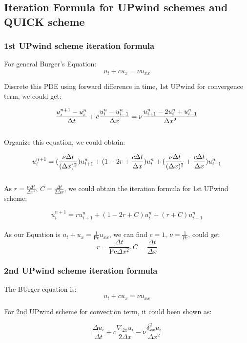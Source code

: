 \documentclass[12pt]{article}
\begin{document}
\subsection{Iteration Formula for UPwind schemes and QUICK 
scheme}

\subsubsection{1st UPwind scheme iteration formula}

For general Burger's Equation:
$$
u_t + cu_x = {\nu} u_{xx}
$$

Discrete this PDE using forward difference in time,
1st UPwind for convergence term, we could get:

$$
\frac{u_i^{n+1} - u_i^n}{\Delta t} + c \frac{u_{i}^n - u_{i-1}^n}{\Delta x} = \nu \frac{u_{i+1}^n - 2u_i^n + u_{i-1}^n}{\Delta x^2} \\
$$\\

Organize this equation, we could obtain:

$$
u_i^{n+1} = (\frac{\nu \Delta t}{(\Delta x)^2})u_{i+1}^n + (1-2r+\frac{c\Delta t}{\Delta x})u_i^n + (\frac{\nu \Delta t}{(\Delta x)^2}  + \frac{c\Delta t}{\Delta x})u_{i-1}^n \\
$$\\

As \( r = \frac{\nu \Delta t}{\Delta x^2} \), \( C = \frac{\Delta t}{2\Delta x} \),
we could obtain the iteration formula for 1st UPwind scheme:

$$
u_i^{n+1} = r u_{i+1}^n + (1-2r +C)u_i^n +  (r + C)u_{i-1}^n
$$\\

As our Equation is \( u_t + u_x = \frac{1}{\text{Pe}} u_{xx} \), 
we can find \( c = 1 \),
$\nu = \frac{1}{Pe}$,
could get 
 $$ r = \frac{\Delta t}{\text{Pe}\Delta x^2} ,  C = \frac{\Delta t}{\Delta x} $$



\subsubsection{2nd UPwind scheme iteration formula}
The BUrger equation is:
\[
u_t + c u_x = \nu u_{xx}
\]

For 2nd UPwind scheme for convection term, it could been shown
as:

\[
\frac{\Delta u_i}{\Delta t} + c \frac{\nabla_{2x} u_i}{2 \Delta x} - \nu \frac{\delta^2_{xx} u_i}{\Delta x^2}
\]
\end{document}
